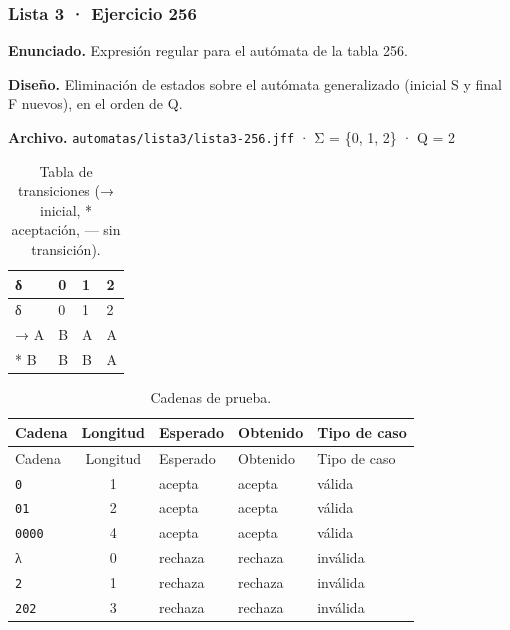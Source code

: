 
\hypertarget{lista-3-ejercicio-256}{%
\subsubsection{Lista 3 · Ejercicio 256}\label{lista-3-ejercicio-256}}

\textbf{Enunciado.} Expresión regular para el autómata de la tabla 256.

\textbf{Diseño.} Eliminación de estados sobre el autómata generalizado (inicial S y final F nuevos), en el orden de Q.

\textbf{Archivo.} \texttt{automatas/lista3/lista3-256.jff} · Σ = \{0, 1, 2\} · \textbar Q\textbar{} = 2

\begin{longtable}[]{@{}llll@{}}
\caption{Tabla de transiciones (→ inicial, * aceptación, --- sin transición).}\tabularnewline
\toprule\noalign{}
δ & 0 & 1 & 2 \\
\midrule\noalign{}
\endfirsthead
\toprule\noalign{}
δ & 0 & 1 & 2 \\
\midrule\noalign{}
\endhead
\bottomrule\noalign{}
\endlastfoot
→ A & B & A & A \\
* B & B & B & A \\
\end{longtable}

\begin{longtable}[]{@{}lclll@{}}
\caption{Cadenas de prueba.}\tabularnewline
\toprule\noalign{}
Cadena & Longitud & Esperado & Obtenido & Tipo de caso \\
\midrule\noalign{}
\endfirsthead
\toprule\noalign{}
Cadena & Longitud & Esperado & Obtenido & Tipo de caso \\
\midrule\noalign{}
\endhead
\bottomrule\noalign{}
\endlastfoot
\texttt{0} & 1 & acepta & acepta & válida \\
\texttt{01} & 2 & acepta & acepta & válida \\
\texttt{0000} & 4 & acepta & acepta & válida \\
λ & 0 & rechaza & rechaza & inválida \\
\texttt{2} & 1 & rechaza & rechaza & inválida \\
\texttt{202} & 3 & rechaza & rechaza & inválida \\
\end{longtable}

